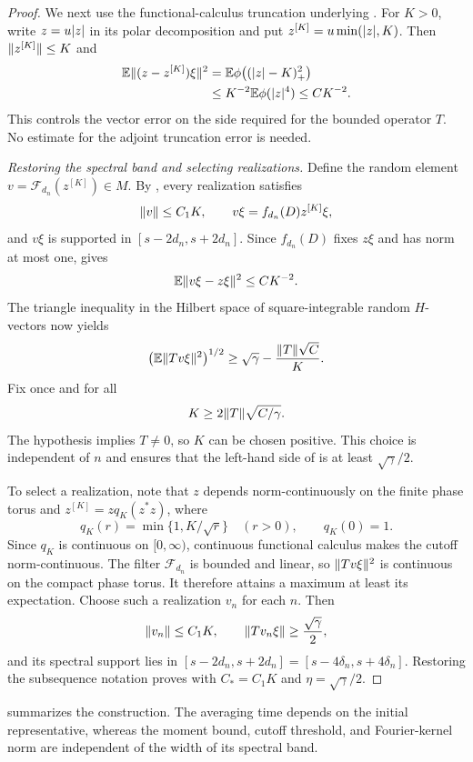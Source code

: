 \begin{proof}
We next use the functional-calculus truncation underlying
\cite[Lemma~2.6, equations~(2.15)--(2.20)]{HaagerupMusat2007}.
For $K>0$, write $z=u\lvert z\rvert$ in its polar decomposition and put
$z^{[K]}=u\min(\lvert z\rvert,K)$.  Then $\lVert z^{[K]}\rVert\le K$ and
\begin{equation}
\label{eq:recovery-truncation}
 \begin{aligned}
 \mathbb E\lVert(z-z^{[K]})\xi\rVert^{2}
 &=\mathbb E\phi\bigl((\lvert z\rvert-K)_+^2\bigr)\\
 &\le K^{-2}\mathbb E\phi(\lvert z\rvert^{4})
 \le CK^{-2}.
 \end{aligned}
\end{equation}
This controls the vector error on the side required for the bounded
operator $T$.  No estimate for the adjoint truncation error is needed.

\smallskip
\noindent\emph{Restoring the spectral band and selecting realizations.}
Define the random element $v=\mathcal F_{d_n}(z^{[K]})\in M$.
By , every realization satisfies
\begin{equation}
\label{eq:recovery-bounded-output}
 \lVert v\rVert\le C_1K,
 \qquad v\xi=f_{d_n}(D)z^{[K]}\xi,
\end{equation}
and $v\xi$ is supported in $[s-2d_n,s+2d_n]$.  Since $f_{d_n}(D)$ fixes
$z\xi$ and has norm at most one,  gives
\[
 \mathbb E\lVert v\xi-z\xi\rVert^{2}\le CK^{-2}.
\]
The triangle inequality in the Hilbert space of square-integrable random
$H$-vectors now yields
\begin{equation}
\label{eq:recovery-fixed-cutoff}
 \bigl(\mathbb E\lVert Tv\xi\rVert^{2}\bigr)^{1/2}
 \ge\sqrt\gamma-\frac{\lVert T\rVert\sqrt C}{K}.
\end{equation}
Fix once and for all
\[
 K\ge2\lVert T\rVert\sqrt{C/\gamma}.
\]
The hypothesis implies $T\ne0$, so $K$ can be chosen positive.  This
choice is independent of $n$ and ensures that the left-hand side of
 is at least $\sqrt\gamma/2$.

To select a realization, note that $z$ depends norm-continuously on the
finite phase torus and $z^{[K]}=zq_K(z^*z)$, where
\[
 q_K(r)=\min\{1,K/\sqrt r\}\quad(r>0),\qquad q_K(0)=1.
\]
Since $q_K$ is continuous on $[0,\infty)$, continuous functional calculus
makes the cutoff norm-continuous. The filter $\mathcal F_{d_n}$ is bounded
and linear, so $\lVert Tv\xi\rVert^2$ is continuous on the compact phase torus.
It therefore attains a maximum at least its expectation.
Choose such a realization $v_n$ for each $n$. Then
\[
 \lVert v_n\rVert\le C_1K,
 \qquad \lVert Tv_n\xi\rVert\ge\frac{\sqrt\gamma}{2},
\]
and its spectral support lies in
$[s-2d_n,s+2d_n]=[s-4\delta_n,s+4\delta_n]$.
Restoring the subsequence notation proves  with
$C_*=C_1K$ and $\eta=\sqrt\gamma/2$.
\end{proof}

 summarizes the construction. The averaging
time depends on the initial representative, whereas the moment bound,
cutoff threshold, and Fourier-kernel norm are independent of the width
of its spectral band.

